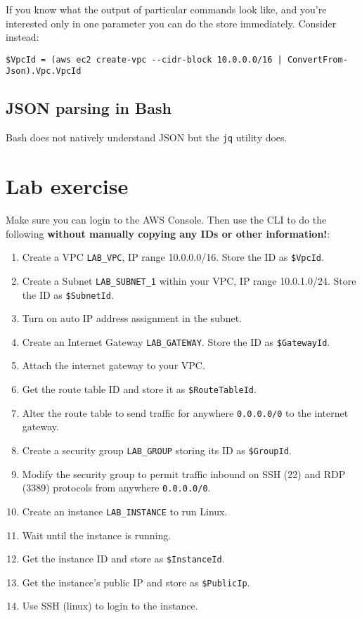 If you know what the output of particular commands look like, and you're interested only in one parameter you can do the store immediately.
Consider instead:
\begin{verbatim}
$VpcId = (aws ec2 create-vpc --cidr-block 10.0.0.0/16 | ConvertFrom-Json).Vpc.VpcId
\end{verbatim}

\subsection{JSON parsing in Bash}

Bash does not natively understand JSON but the \texttt{jq} utility does.

\section{Lab exercise}

Make sure you can login to the AWS Console.
Then use the CLI to do the following \textbf{without manually copying any IDs or other information!}:
\begin{enumerate}
\item Create a VPC \texttt{LAB\_VPC}, IP range 10.0.0.0/16. Store the ID as \texttt{\$VpcId}. 
\item Create a Subnet \texttt{LAB\_SUBNET\_1} within your VPC, IP range 10.0.1.0/24. Store the ID as \texttt{\$SubnetId}. 
\item Turn on auto IP address assignment in the subnet.
\item Create an Internet Gateway \texttt{LAB\_GATEWAY}. Store the ID as \texttt{\$GatewayId}. 
\item Attach the internet gateway to your VPC.
\item Get the route table ID and store it as \texttt{\$RouteTableId}. 
\item Alter the route table to send traffic for anywhere \texttt{0.0.0.0/0} to the internet gateway.
\item Create a security group \texttt{LAB\_GROUP} storing its ID as \texttt{\$GroupId}. 
\item Modify the security group to permit traffic inbound on SSH (22) and RDP (3389) protocols from anywhere \texttt{0.0.0.0/0}.
\item Create an instance \texttt{LAB\_INSTANCE} to run Linux. 
\item Wait until the instance is running.
\item Get the instance ID and store as \texttt{\$InstanceId}. 
\item Get the instance's public IP and store as \texttt{\$PublicIp}. 
\item Use SSH (linux) to login to the instance.
\end{enumerate}


